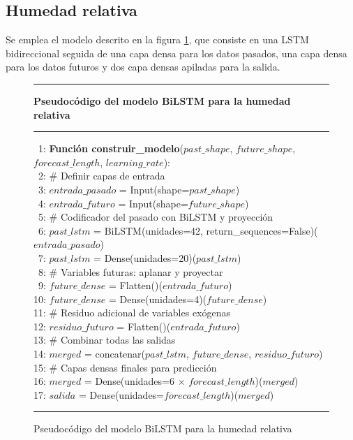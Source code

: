 \subsection{Humedad relativa}

Se emplea el modelo descrito en la figura \ref{lstm_model_hum}, que consiste en una LSTM bidireccional seguida de una capa densa para los datos pasados, una
capa densa para los datos futuros y dos capa densas apiladas para la salida.

\begin{figure}[H]
{\small
\hrule
{\bf\small Pseudocódigo del modelo BiLSTM para la humedad relativa}
\hrule
\begin{center}
\begin{tabbing}
\ 1: {\bf Fun}\={\bf ción construir\_modelo}($past\_shape$, $future\_shape$, $forecast\_length$, $learning\_rate$): \\
\ 2: \> \# Definir capas de entrada \\
\ 3: \> $entrada\_pasado$ = Input(shape=$past\_shape$) \\
\ 4: \> $entrada\_futuro$ = Input(shape=$future\_shape$) \\
\ 5: \> \# Codificador del pasado con BiLSTM y proyección \\
\ 6: \> $past\_lstm$ = BiLSTM(unidades=42, return\_sequences=False)($entrada\_pasado$) \\
\ 7: \> $past\_lstm$ = Dense(unidades=20)($past\_lstm$) \\
\ 8: \> \# Variables futuras: aplanar y proyectar \\
\ 9: \> $future\_dense$ = Flatten()($entrada\_futuro$) \\
10: \> $future\_dense$ = Dense(unidades=4)($future\_dense$) \\
11: \> \# Residuo adicional de variables exógenas \\
12: \> $residuo\_futuro$ = Flatten()($entrada\_futuro$) \\
13: \> \# Combinar todas las salidas \\
14: \> $merged$ = concatenar($past\_lstm$, $future\_dense$, $residuo\_futuro$) \\
15: \> \# Capas densas finales para predicción \\
16: \> $merged$ = Dense(unidades=6 $\times$ $forecast\_length$)($merged$) \\
17: \> $salida$ = Dense(unidades=$forecast\_length$)($merged$) \\
\end{tabbing}
\end{center}
}
\hrule
\caption{Pseudocódigo del modelo BiLSTM para la humedad relativa}
\label{lstm_model_hum}
\end{figure}


